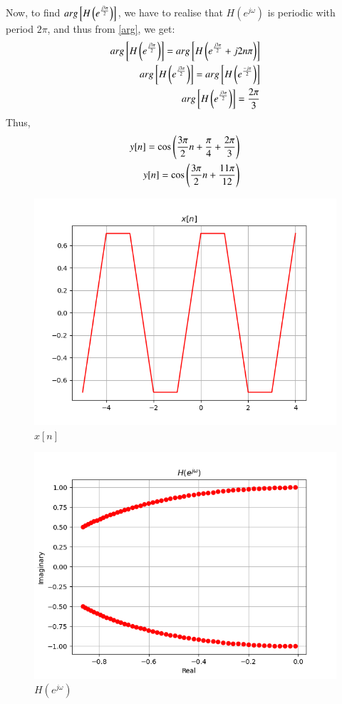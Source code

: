 \documentclass[journal,12pt,twocolumn]{IEEEtran}
\begin{document}
Now, to find $arg{}\left[H\left(e^{\frac{j3\pi}{2}}\right)\right]$, we have to realise that $H(e^{j\omega})$ is periodic with period $2\pi$, and thus from \eqref{arg}, we get:
\begin{align}
    arg{}\left[H\left(e^{\frac{j3\pi}{2}}\right)\right] = arg{}\left[H\left(e^{\frac{j3\pi}{2}} + j2n\pi\right)\right]\\
    arg{}\left[H\left(e^{\frac{j3\pi}{2}}\right)\right] = arg{}\left[H\left(e^{\frac{-j\pi}{2}}\right)\right]\\
    arg{}\left[H\left(e^{\frac{j3\pi}{2}}\right)\right] = \frac{2\pi}{3}
\end{align}
Thus, 
\begin{align}
    y[n] = \cos\left(\frac{3\pi}{2}n + \frac{\pi}{4} + \frac{2\pi}{3}\right)\\
    y[n] = \cos\left(\frac{3\pi}{2}n +  \frac{11\pi}{12}\right)
\end{align}
\begin{figure}[!ht]
\centering
 \includegraphics[width=\columnwidth]{Graphs/x_n.png}
 \caption{$x[n]$}
 \end{figure}
 \begin{figure}[!ht]
\centering
 \includegraphics[width=\columnwidth]{Graphs/H.png}
 \caption{$H(e^{j\omega})$}
 \end{figure}
\end{document}
